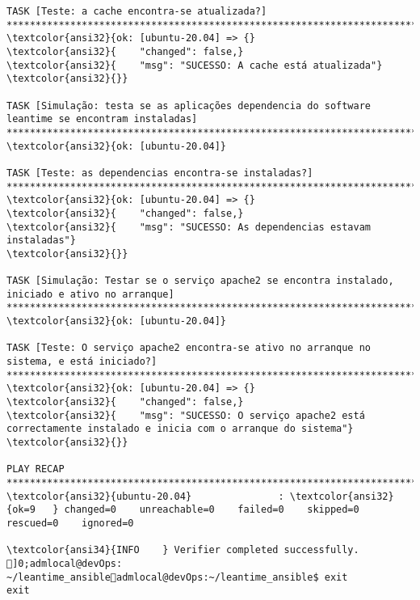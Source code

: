 \documentclass{scrartcl}
\begin{document}
\begin{Verbatim}
TASK [Teste: a cache encontra-se atualizada?] ***********************************************************************************************************************************************
\textcolor{ansi32}{ok: [ubuntu-20.04] => {}
\textcolor{ansi32}{    "changed": false,}
\textcolor{ansi32}{    "msg": "SUCESSO: A cache está atualizada"}
\textcolor{ansi32}{}}

TASK [Simulação: testa se as aplicações dependencia do software leantime se encontram instaladas] *******************************************************************************************
\textcolor{ansi32}{ok: [ubuntu-20.04]}

TASK [Teste: as dependencias encontra-se instaladas?] ***************************************************************************************************************************************
\textcolor{ansi32}{ok: [ubuntu-20.04] => {}
\textcolor{ansi32}{    "changed": false,}
\textcolor{ansi32}{    "msg": "SUCESSO: As dependencias estavam instaladas"}
\textcolor{ansi32}{}}

TASK [Simulação: Testar se o serviço apache2 se encontra instalado, iniciado e ativo no arranque] *******************************************************************************************
\textcolor{ansi32}{ok: [ubuntu-20.04]}

TASK [Teste: O serviço apache2 encontra-se ativo no arranque no sistema, e está iniciado?] **************************************************************************************************
\textcolor{ansi32}{ok: [ubuntu-20.04] => {}
\textcolor{ansi32}{    "changed": false,}
\textcolor{ansi32}{    "msg": "SUCESSO: O serviço apache2 está correctamente instalado e inicia com o arranque do sistema"}
\textcolor{ansi32}{}}

PLAY RECAP **********************************************************************************************************************************************************************************
\textcolor{ansi32}{ubuntu-20.04}               : \textcolor{ansi32}{ok=9   } changed=0    unreachable=0    failed=0    skipped=0    rescued=0    ignored=0

\textcolor{ansi34}{INFO    } Verifier completed successfully.
]0;admlocal@devOps: ~/leantime_ansibleadmlocal@devOps:~/leantime_ansible$ exit
exit

\end{Verbatim}
\end{document}

